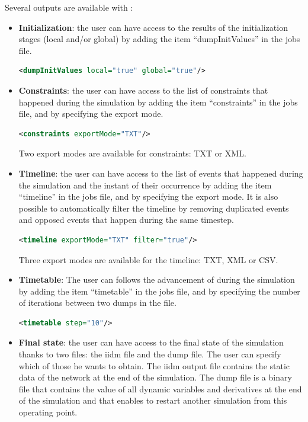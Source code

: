 \documentclass[a4paper, 12pt]{report}
\begin{document}
Several outputs are available with \Dynawo:
\begin{itemize}
\item \textbf{Initialization}: the user can have access to the results of the initialization stages (local and/or global) by adding the item ``dumpInitValues'' in the jobs file.

\begin{lstlisting}[language=XML, morekeywords={dumpInitValues},numbers=none]
<dumpInitValues local="true" global="true"/>
\end{lstlisting}

\item \textbf{Constraints}: the user can have access to the list of constraints that happened during the simulation by adding the item ``constraints'' in the jobs file, and by specifying the export mode.
\begin{lstlisting}[language=XML, morekeywords={constraints},numbers=none]
<constraints exportMode="TXT"/>
\end{lstlisting}
Two export modes are available for constraints: TXT or XML.

\item \textbf{Timeline}: the user can have access to the list of events that happened during the simulation and the instant of their occurrence by adding the item ``timeline'' in the jobs file, and by specifying the export mode. It is also possible to automatically filter the timeline by removing duplicated events and opposed events that happen during the same timestep.

\begin{lstlisting}[language=XML, morekeywords={timeline},numbers=none]
<timeline exportMode="TXT" filter="true"/>
\end{lstlisting}
Three export modes are available for the timeline: TXT, XML or CSV.

\item \textbf{Timetable}: The user can follows the advancement of \Dynawo during the simulation by adding the item ``timetable'' in the jobs file, and by specifying the number of iterations between two dumps in the file.

\begin{lstlisting}[language=XML, morekeywords={timeline},numbers=none]
<timetable step="10"/>
\end{lstlisting}

\item \textbf{Final state}: the user can have access to the final state of the simulation thanks to two files: the iidm file and the dump file. The user can specify which of those he wants to obtain. The iidm output file contains the static data of the network at the end of the simulation. The dump file is a binary file that contains the value of all dynamic variables and derivatives at the end of the simulation and that enables to restart another simulation from this operating point.


\end{itemize}
\end{document}
